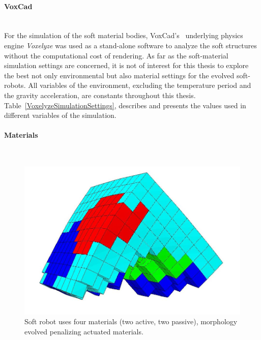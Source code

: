\paragraph*{VoxCad}~\\

For the simulation of the soft material bodies, VoxCad's~\citep{hiller2012dynamic} underlying physics engine \emph{Voxelyze} was used as a stand-alone software to analyze the soft structures without the computational cost of rendering. As far as the soft-material simulation settings are concerned, it is not of interest for this thesis to explore the best not only environmental but also material settings for the evolved soft-robots. All variables of the environment, excluding the temperature period and the gravity acceleration, are constants throughout this thesis. Table~\ref{VoxelyzeSimulationSettings}, describes and presents the values used in different variables of the simulation.



\paragraph*{Materials}~\\

\begin{figure}
\centering
\includegraphics[height=0.2\textheight]{../Figures/Misc/allSoftMaterials.png}
\caption{Soft robot uses four materials (two active, two passive), morphology evolved penalizing actuated materials.}
\label{fig:allSoftMaterials}
\end{figure}

